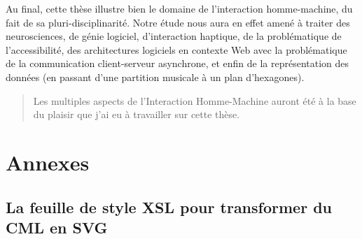 \documentclass[
]{book}
\begin{document}
Au final, cette thèse illustre bien le domaine de l'interaction
homme-machine, du fait de sa pluri-disciplinarité. Notre étude nous aura en
effet amené à traiter des neurosciences, de génie logiciel, d'interaction
haptique, de la problématique de l'accessibilité, des architectures logiciels
en contexte Web avec la problématique de la communication client-serveur
asynchrone, et enfin de la représentation des données (en passant d'une
partition musicale à un plan d'hexagones).

\begin{quote}
Les multiples aspects de l'Interaction
Homme-Machine auront été à la base du plaisir que j'ai eu à travailler
sur cette thèse.
\end{quote}

\hypertarget{annexes}{%
\chapter{Annexes}\label{annexes}}

\hypertarget{la-feuille-de-style-xsl-pour-transformer-du-cml-en-svg}{%
\section{La feuille de style XSL pour transformer du CML en SVG}\label{la-feuille-de-style-xsl-pour-transformer-du-cml-en-svg}}
\end{document}
